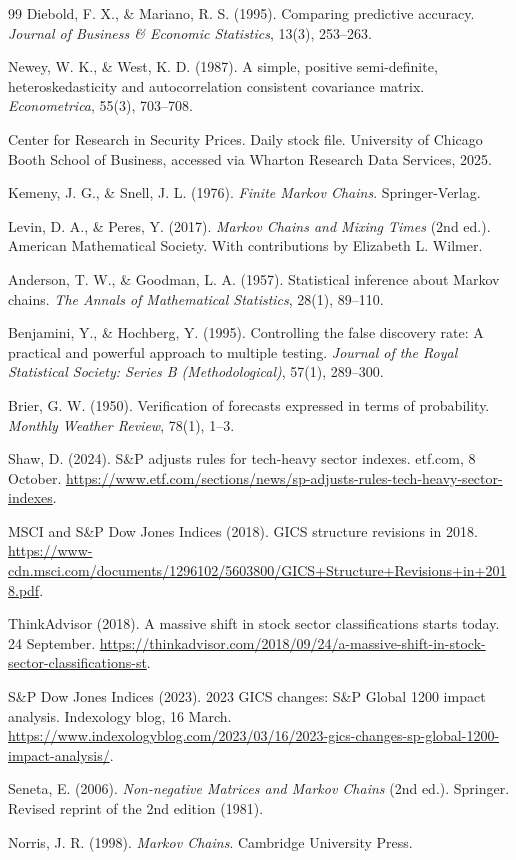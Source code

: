 \documentclass[11pt]{article}
\begin{document}
\begin{thebibliography}{99}
Diebold, F. X., \& Mariano, R. S. (1995).
Comparing predictive accuracy.
\textit{Journal of Business \& Economic Statistics}, 13(3), 253--263.

Newey, W. K., \& West, K. D. (1987).
A simple, positive semi-definite, heteroskedasticity and autocorrelation consistent covariance matrix.
\textit{Econometrica}, 55(3), 703--708.

Center for Research in Security Prices.
Daily stock file. University of Chicago Booth School of Business, accessed via Wharton Research Data Services, 2025.

Kemeny, J. G., \& Snell, J. L. (1976).
\textit{Finite Markov Chains}.
Springer-Verlag.

Levin, D. A., \& Peres, Y. (2017).
\textit{Markov Chains and Mixing Times} (2nd ed.).
American Mathematical Society. With contributions by Elizabeth L. Wilmer.

Anderson, T. W., \& Goodman, L. A. (1957).
Statistical inference about Markov chains.
\textit{The Annals of Mathematical Statistics}, 28(1), 89--110.

Benjamini, Y., \& Hochberg, Y. (1995).
Controlling the false discovery rate: A practical and powerful approach to multiple testing.
\textit{Journal of the Royal Statistical Society: Series B (Methodological)}, 57(1), 289--300.

Brier, G. W. (1950).
Verification of forecasts expressed in terms of probability.
\textit{Monthly Weather Review}, 78(1), 1--3.

Shaw, D. (2024).
S\&P adjusts rules for tech-heavy sector indexes.
etf.com, 8 October. \url{https://www.etf.com/sections/news/sp-adjusts-rules-tech-heavy-sector-indexes}.

MSCI and S\&P Dow Jones Indices (2018).
GICS structure revisions in 2018.
\url{https://www-cdn.msci.com/documents/1296102/5603800/GICS+Structure+Revisions+in+2018.pdf}.

ThinkAdvisor (2018).
A massive shift in stock sector classifications starts today. 24 September.
\url{https://thinkadvisor.com/2018/09/24/a-massive-shift-in-stock-sector-classifications-st}.

S\&P Dow Jones Indices (2023).
2023 GICS changes: S\&P Global 1200 impact analysis. Indexology blog, 16 March.
\url{https://www.indexologyblog.com/2023/03/16/2023-gics-changes-sp-global-1200-impact-analysis/}.

Seneta, E. (2006).
\textit{Non-negative Matrices and Markov Chains} (2nd ed.).
Springer. Revised reprint of the 2nd edition (1981).

Norris, J. R. (1998).
\textit{Markov Chains}.
Cambridge University Press.

\end{thebibliography}
\end{document}
